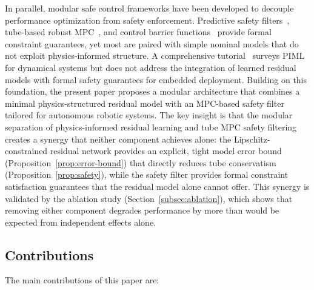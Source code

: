 \documentclass[12pt,a4paper]{article}
\begin{document}
In parallel, modular safe control frameworks have been developed to
decouple performance optimization from safety enforcement. Predictive
safety filters~\cite{wabersich2021psf}, tube-based robust
MPC~\cite{mayne2005robust}, and control barrier
functions~\cite{ames2017cbf,dawson2023survey} provide formal
constraint guarantees, yet most are paired with simple nominal models
that do not exploit physics-informed structure. A comprehensive
tutorial~\cite{nghiem2023piml} surveys PIML for dynamical systems but
does not address the integration of learned residual models with formal
safety guarantees for embedded deployment.
Building on this foundation, the present paper proposes a modular
architecture that combines a minimal physics-structured residual model
with an MPC-based safety filter tailored for autonomous robotic systems.
The key insight is that the modular separation of physics-informed
residual learning and tube MPC safety filtering creates a synergy that
neither component achieves alone: the Lipschitz-constrained residual
network provides an explicit, tight model error bound
(Proposition~\ref{prop:error-bound}) that directly reduces tube
conservatism (Proposition~\ref{prop:safety}), while the safety filter
provides formal constraint satisfaction guarantees that the residual
model alone cannot offer. This synergy is validated by the ablation
study (Section~\ref{subsec:ablation}), which shows that removing
either component degrades performance by more than would be expected
from independent effects alone.

\subsection{Contributions}
\label{subsec:contributions}

The main contributions of this paper are:
\end{document}
